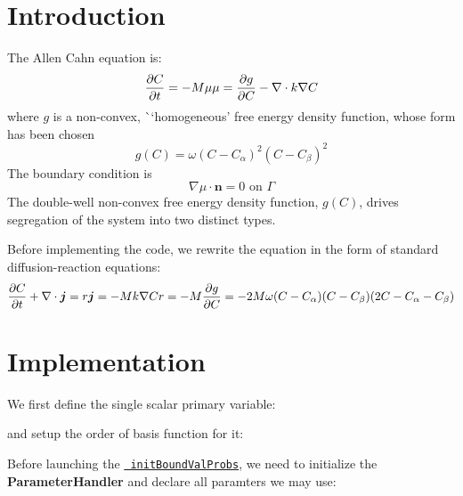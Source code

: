 \hypertarget{growth_Introduction}{}\section{Introduction}\label{growth_Introduction}
The Allen Cahn equation is\+: \[ \frac{\partial C}{\partial t}=-M\mu\\ \mu=\frac{\partial g}{\partial C}-\nabla\cdot k\nabla C \] where $g$ is a non-\/convex, \`{}`homogeneous'\textquotesingle{} free energy density function, whose form has been chosen \[ g(C)=\omega(C-C_\alpha)^2(C-C_\beta)^2 \] The boundary condition is \[ \nabla \mu\cdot\boldsymbol{n}=0 \text{ on }\Gamma \] The double-\/well non-\/convex free energy density function, $g(C)$, drives segregation of the system into two distinct types.

Before implementing the code, we rewrite the equation in the form of standard diffusion-\/reaction equations\+: \[ \frac{\partial C}{\partial t}+\nabla\cdot\boldsymbol{j}=r\\ \boldsymbol{j}=-Mk\nabla C\\ r=-M\frac{\partial g}{\partial C}=-2M\omega(C-C_\alpha)(C-C_\beta)(2C-C_\alpha-C_\beta) \]\hypertarget{growth_imple}{}\section{Implementation}\label{growth_imple}
We first define the single scalar primary variable\+: 
\begin{DoxyCode}{0}
\end{DoxyCode}
 and setup the order of basis function for it\+: 
\begin{DoxyCode}{0}
\end{DoxyCode}
 Before launching the \href{../html/classinit_bound_val_probs.html}{\texttt{ init\+Bound\+Val\+Probs}}, we need to initialize the {\bfseries{Parameter\+Handler}} and declare all paramters we may use\+: 
\begin{DoxyCode}{0}
\DoxyCodeLine{\textcolor{comment}{//... more parameters }}
\end{DoxyCode}
